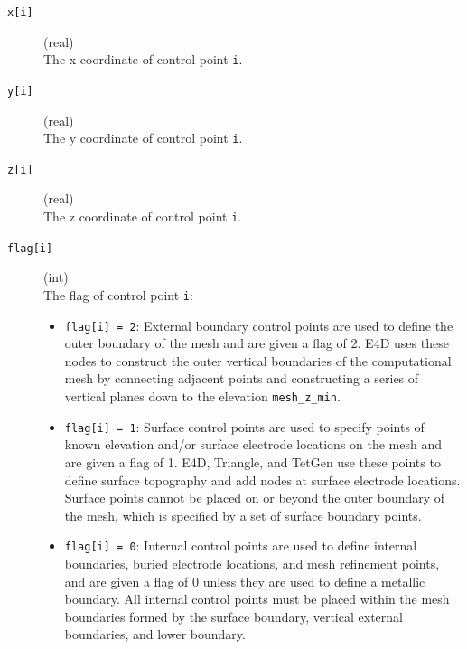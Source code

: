 \documentclass[a4paper,12pt]{article}
\begin{document}
\begin{description}
    \item[\texttt{x[i]}] (real)\hfill \\
          The x coordinate of control point \texttt{i}.

    \item[\texttt{y[i]}] (real)\hfill \\
          The y coordinate of control point \texttt{i}.

    \item[\texttt{z[i]}] (real)\hfill \\
          The z coordinate of control point \texttt{i}.

    \item[\texttt{flag[i]}] (int)\hfill \\
          The flag of control point \texttt{i}:
          \begin{itemize}
              \item \texttt{flag[i] = 2}: External boundary control points are used to define the outer boundary of the mesh and are given a flag of 2. E4D uses these nodes to construct the outer vertical boundaries of the computational mesh by connecting adjacent points and constructing a series of vertical planes down to the elevation \texttt{mesh\_z\_min}.
              \item \texttt{flag[i] = 1}: Surface control points are used to specify points of known elevation and/or surface electrode locations on the mesh and are given a flag of 1. E4D, Triangle, and TetGen use these points to define surface topography and add nodes at surface electrode locations. Surface points cannot be placed on or beyond the outer boundary of the mesh, which is specified by a set of surface boundary points.
              \item \texttt{flag[i] = 0}: Internal control points are used to define internal boundaries, buried electrode locations, and mesh refinement points, and are given a flag of 0 unless they are used to define a metallic boundary. All internal control points must be placed within the mesh boundaries formed by the surface boundary, vertical external boundaries, and lower boundary.
          \end{itemize}


\end{description}
\end{document}
